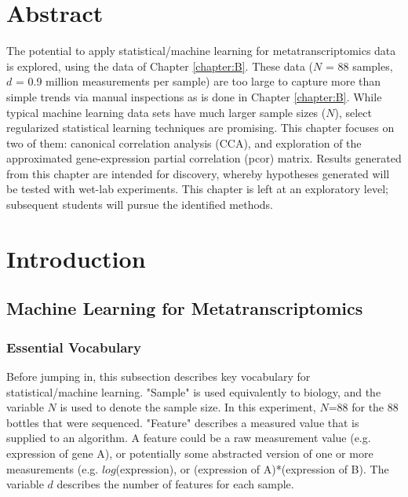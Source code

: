 
\section{Abstract}

The potential to apply statistical/machine learning for metatranscriptomics data is explored, using the data of Chapter \ref{chapter:B}.
These data ($N$  = 88 samples, $d$ = 0.9 million measurements per sample) are too large to capture more than simple trends via manual inspections as is done in Chapter \ref{chapter:B}.
While typical machine learning data sets have much larger sample sizes ($N$), select regularized statistical learning techniques are promising.
This chapter focuses on two of them: canonical correlation analysis (CCA), and exploration of the approximated gene-expression partial correlation (pcor) matrix.
Results generated from this chapter are intended for discovery, whereby hypotheses generated will be tested with wet-lab experiments.
This chapter is left at an exploratory level; subsequent students will pursue the identified methods.


\section{Introduction}

\subsection{Machine Learning for Metatranscriptomics}

\subsubsection{Essential Vocabulary}

Before jumping in, this subsection describes key vocabulary for statistical/machine learning.
"Sample" is used equivalently to biology, and the variable $N$ is used to denote the sample size.
In this experiment, $N$=88 for the 88 bottles that were sequenced.
"Feature" describes a measured value that is supplied to an algorithm.
A feature could be a raw measurement value (e.g. expression of gene A), or potentially some abstracted version of one or more measurements (e.g. $log$(expression), or (expression of A)*(expression of B).
The variable $d$ describes the number of features for each sample.

